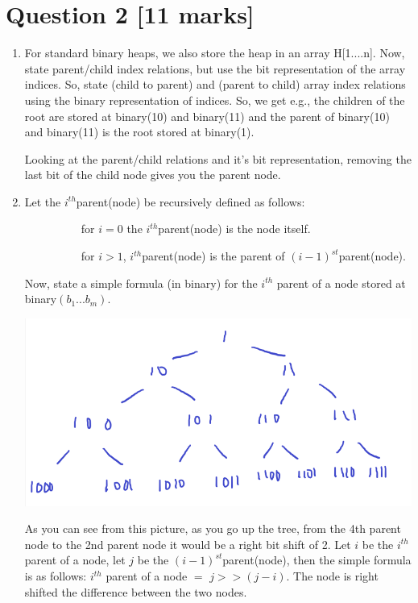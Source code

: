 \documentclass[11pt]{article}
\begin{document}
\section*{Question 2 [11 marks]}

\begin{enumerate}
	\item  For standard  binary heaps, we also store the heap in an array H[1....n]. Now,  state parent/child index relations, but use the bit representation of the array indices.  So, state (child to parent) and (parent to child) array index relations using the binary representation of indices. So,  
	      we get e.g., the children of the root are stored at binary(10) and binary(11) and the parent of binary(10) and binary(11) is the root stored at binary(1).
	
	Looking at the parent/child relations and it's bit representation, removing the last bit of the child node gives you the parent node.

	\item Let the $i^{th}$parent(node) be recursively defined as follows:
	
	\ \ \ \ \ \ \ \ \ \  for $i=0$ the $i^{th}$parent(node) is the node itself.
	
\ \ \ \ \ \ \ \ \ \  for $i>1$, $i^{th}$parent(node) is the parent of  $(i-1)^{st}$parent(node).		

		Now, state a simple formula (in binary) for the $i^{th}$ parent of a node stored at binary$(b_1 ... b_m)$.

		\includegraphics[width=\textwidth]{q2.png}

		As you can see from this picture, as you go up the tree, from the 4th parent node to the 2nd parent node it would be a right bit shift of 2.
		Let $i$ be the $i^{th}$ parent of a node, let $j$ be the $(i-1)^{st}$parent(node), then the simple formula is as follows:
		$i^{th}$ parent of a node $=$ $j >> (j-i)$. The node is right shifted the difference between the two nodes.

\end{enumerate}
\end{document}
